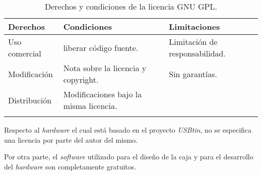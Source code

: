 \begin{longtable}[]{@{}lll@{}}
\toprule
\begin{minipage}[b]{0.20\columnwidth}\raggedright\strut
Derechos\strut
\end{minipage} & \begin{minipage}[b]{0.33\columnwidth}\raggedright\strut
Condiciones\strut
\end{minipage} & \begin{minipage}[b]{0.33\columnwidth}\raggedright\strut
Limitaciones\strut
\end{minipage}\tabularnewline
\midrule
\endhead
\begin{minipage}[t]{0.20\columnwidth}\raggedright\strut
Uso comercial\strut
\end{minipage} & \begin{minipage}[t]{0.33\columnwidth}\raggedright\strut
liberar código fuente.\strut
\end{minipage} & \begin{minipage}[t]{0.33\columnwidth}\raggedright\strut
Limitación de responsabilidad.\strut
\end{minipage}\tabularnewline
\begin{minipage}[t]{0.20\columnwidth}\raggedright\strut
Modificación\strut
\end{minipage} & \begin{minipage}[t]{0.33\columnwidth}\raggedright\strut
Nota sobre la licencia y copyright.\strut
\end{minipage} & \begin{minipage}[t]{0.33\columnwidth}\raggedright\strut
Sin garantías.\strut
\end{minipage}\tabularnewline
\begin{minipage}[t]{0.20\columnwidth}\raggedright\strut
Distribución\strut
\end{minipage} & \begin{minipage}[t]{0.33\columnwidth}\raggedright\strut
Modificaciones bajo la misma licencia.\strut
\end{minipage} & \begin{minipage}[t]{0.33\columnwidth}\raggedright\strut
\strut
\end{minipage}\tabularnewline
\bottomrule
\caption{Derechos y condiciones de la licencia GNU GPL.}
\end{longtable}


Respecto al \emph{hardware} el cual está basado en el proyecto \emph{USBtin}, no se especifica una licencia por parte del autor del mismo.

Por otra parte, el \emph{software} utilizado para el diseño de la caja y para el desarrollo del \emph{hardware} son completamente gratuitos.
